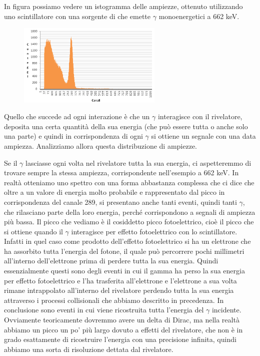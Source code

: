 \begin{esempio}\label{es:distr_ampiezze_cesio}
   In figura possiamo vedere un istogramma delle ampiezze, ottenuto utilizzando uno scintillatore con una sorgente di  che emette $\gamma$ monoenergetici a 662 keV.

\begin{figure}[H]
   \centering
   \includegraphics[width=0.615\textwidth]{immagini/distribuzione_ampiezze_impulsi_es_1.png}
\end{figure}

Quello che succede ad ogni interazione è che un $\gamma$ interagisce con il rivelatore, deposita una certa quantità della sua energia (che può essere tutta o anche solo una parte) e quindi in corrispondenza di ogni $\gamma$ si ottiene un segnale con una data ampiezza. Analizziamo allora questa distribuzione di ampiezze.

Se il $\gamma$ lasciasse ogni volta nel rivelatore tutta la sua energia, ci aspetteremmo di trovare sempre la stessa ampiezza, corrispondente nell'esempio a 662 keV. In realtà otteniamo uno spettro con una forma abbastanza complessa che ci dice che oltre a un valore di energia molto probabile e rappresentato dal picco in corrispondenza del canale 289, si presentano anche tanti eventi, quindi tanti $\gamma$, che rilasciano parte della loro energia, perché corrispondono a segnali di ampiezza più bassa. Il picco che vediamo è il cosiddetto picco fotoelettrico, cioè il picco che si ottiene quando il $\gamma$ interagisce per effetto fotoelettrico con lo scintillatore. Infatti in quel caso come prodotto dell'effetto fotoelettrico si ha un elettrone che ha assorbito tutta l'energia del fotone, il quale può percorrere pochi millimetri all'interno dell'elettrone prima di perdere tutta la sua energia. Quindi essenzialmente questi sono degli eventi in cui il gamma ha perso la sua energia per effetto fotoelettrico e l'ha trasferita all'elettrone e l'elettrone a sua volta rimane intrappolato all'interno del rivelatore perdendo tutta la sua energia attraverso i processi collisionali che abbiamo descritto in precedenza. In conclusione sono eventi in cui viene ricostruita tutta l'energia del $\gamma$ incidente. Ovviamente teoricamente dovremmo avere un delta di Dirac\footnotemark, ma nella realtà abbiamo un picco un po' più largo dovuto a effetti del rivelatore, che non è in grado esattamente di ricostruire l'energia con una precisione infinita, quindi abbiamo una sorta di risoluzione dettata dal rivelatore.


\end{esempio}
